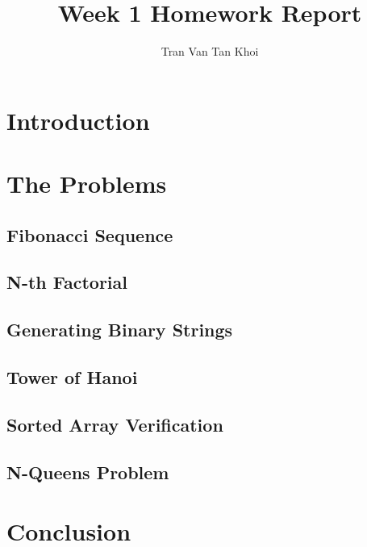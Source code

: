 \documentclass{article}
\author{Tran Van Tan Khoi}
\title{Week 1 Homework Report}
\begin{document}
    \maketitle



    \section{Introduction}
    


    \section{The Problems}



    \subsection{Fibonacci Sequence}

    \subsection{N-th Factorial}

    \subsection{Generating Binary Strings}

    \subsection{Tower of Hanoi}

    \subsection{Sorted Array Verification}

    \subsection{N-Queens Problem}



    \section{Conclusion}
\end{document}
